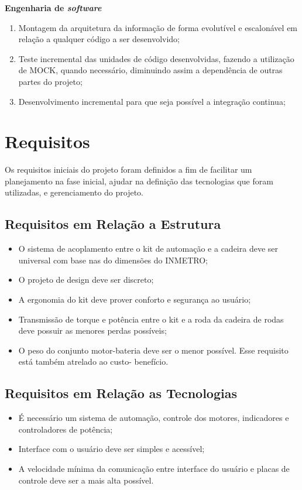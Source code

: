 \textbf{Engenharia de \textit{software}}
  \begin{enumerate}
    \item Montagem da arquitetura da informação de forma evolutível e escalonável em relação a qualquer código a ser desenvolvido;
    \item Teste incremental das unidades de código desenvolvidas, fazendo a utilização de MOCK, quando necessário, diminuindo assim a dependência de outras partes do projeto;
    \item Desenvolvimento incremental para que seja possível a integração continua;
  \end{enumerate}

\section{Requisitos}

Os requisitos iniciais do projeto foram definidos a fim de facilitar um planejamento na fase inicial, ajudar na definição das tecnologias que foram utilizadas, e gerenciamento do projeto.

\subsection{Requisitos em Relação a Estrutura}

  \begin{itemize}
    \item O sistema de acoplamento entre o kit de automação e a cadeira deve ser universal com base nas do dimensões do INMETRO;
    \item O projeto de design deve ser discreto;
    \item A ergonomia do kit deve prover conforto e segurança ao usuário;
    \item Transmissão de torque e potência entre o kit e a roda da cadeira de rodas deve possuir as menores perdas possíveis;
    \item O peso do conjunto motor-bateria deve ser o menor possível. Esse requisito está também atrelado ao custo- benefício.

  \end{itemize}

\subsection{Requisitos em Relação as Tecnologias}

  \begin{itemize}
    \item É necessário um sistema de automação, controle dos motores, indicadores e controladores de potência;
    \item Interface com o usuário deve ser simples e acessível;
    \item A velocidade mínima da comunicação entre interface do usuário e placas de controle deve ser a mais alta possível.
  \end{itemize}

